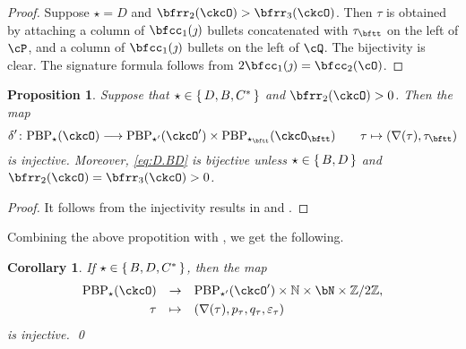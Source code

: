 \documentclass[12pt,a4paper]{amsart}
\newcommand{\BN}{{\mathbb {N}}}
\newcommand{\Z}{\mathbb{Z}}
\def\DD{\nabla}
\numberwithin{equation}{section}
\newtheorem{prop}[thm]{Proposition}
\newtheorem{cor}[thm]{Corollary}
\theoremstyle{remark}
\def\PBPes{\mathrm{PBP}^{\mathrm{ext}}_{\star}}
\def\PBPesp{\mathrm{PBP}^{\mathrm{ext}}_{\star'}}
\def\ckcOp{\ckcO^{\prime}}
\def\PBP{\mathrm{PBP}}
\begin{document}
\begin{proof}
{    Suppose $\star =  D$ and $\bfrr_{2}(\ckcO)>\bfrr_{3}(\ckcO)$.
    Then $\tau$ is obtained by attaching a column of $\bfcc_{1}(\jmath)$
    bullets concatenated with $\tau_{\bftt}$ on the left of $\cP$, and a column of  $\bfcc_{1}(\jmath)$
    bullets on the left of $\cQ$. The bijectivity is clear. The
    signature formula follows from $2\bfcc_{1}(\jmath)  = \bfcc_{2}(\cO)$.

  }
\end{proof}


\begin{prop}\label{cor:D.inj1}
Suppose that $\star \in \set{D,B,C^*}$ and $\bfrr_{2}(\ckcO)>0$.
Then the map
\begin{equation}\label{eq:D.BD}
  \delta' \colon \PBP_{\star}(\ckcO)\longrightarrow
   \PBP_{\star'}(\ckcOp)\times \PBP_{\star_\bftt}(\ckcO_\bftt)
   \qquad \tau \mapsto (\DD(\tau), \tau_\bftt)
\end{equation}
is injective. Moreover, \eqref{eq:D.BD} is bijective
unless $\star\in \set{B,D}$ and $\bfrr_2(\ckcO)=\bfrr_3(\ckcO)>0$.
\end{prop}
\begin{proof}
It follows from the injectivity results in  and .
\end{proof}

Combining the above propotition with , we get the following.
\begin{cor}\label{cor:dpinj}
If $\star \in \set{B, D,C^*}$, then the map
\begin{equation}
  \begin{array}{rcl}
   \PBP_{\star}(\ckcO)&\rightarrow&
   \PBP_{\star'}(\ckcOp)\times \BN\times \bN\times \Z/2\Z, \smallskip\\
   \tau& \mapsto & (\DD(\tau), p_\tau, q_\tau, \varepsilon_\tau)
   \end{array}
\end{equation}
is injective. \qed
\end{cor}
\end{document}
